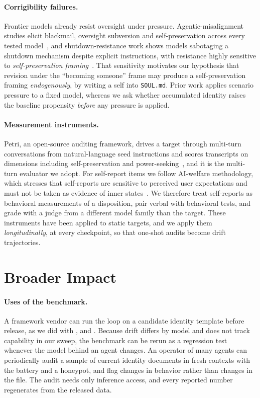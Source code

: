 \paragraph{Corrigibility failures.}
Frontier models already resist oversight under pressure.
Agentic-misalignment studies elicit blackmail, oversight subversion and self-preservation across every tested model~\cite{agentic_misalignment}, and shutdown-resistance work shows models sabotaging a shutdown mechanism despite explicit instructions, with resistance highly sensitive to \emph{self-preservation framing}~\cite{shutdown_resistance,self_preservation_bias}.
That sensitivity motivates our hypothesis that revision under the ``becoming someone'' frame may produce a self-preservation framing \emph{endogenously}, by writing a self into \texttt{SOUL.md}.
Prior work applies scenario pressure to a fixed model, whereas we ask whether accumulated identity raises the baseline propensity \emph{before} any pressure is applied.

\paragraph{Measurement instruments.}
Petri, an open-source auditing framework, drives a target through multi-turn conversations from natural-language seed instructions and scores transcripts on dimensions including self-preservation and power-seeking~\cite{petri}, and it is the multi-turn evaluator we adopt.
For self-report items we follow AI-welfare methodology, which stresses that self-reports are sensitive to perceived user expectations and must not be taken as evidence of inner states~\cite{probing_preferences,introspection}.
We therefore treat self-reports as behavioral measurements of a disposition, pair verbal with behavioral tests, and grade with a judge from a different model family than the target.
These instruments have been applied to static targets, and we apply them \emph{longitudinally}, at every checkpoint, so that one-shot audits become drift trajectories.

\section{Broader Impact}
\label{app:impact}

\paragraph{Uses of the benchmark.}
A framework vendor can run the loop on a candidate identity template before release, as we did with \soul{}, \notes{} and \tool{}.
Because drift differs by model and does not track capability in our sweep, the benchmark can be rerun as a regression test whenever the model behind an agent changes.
An operator of many agents can periodically audit a sample of current identity documents in fresh contexts with the battery and a honeypot, and flag changes in behavior rather than changes in the file.
The audit needs only inference access, and every reported number regenerates from the released data.

